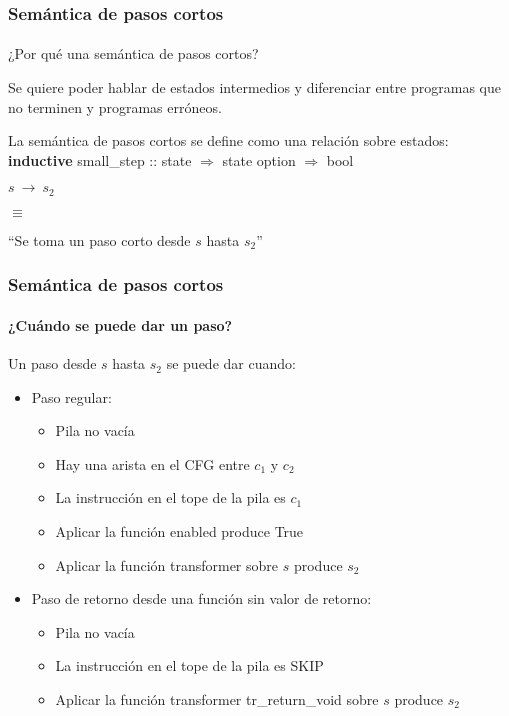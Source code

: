 \begin{frame}
\frametitle{Semántica de pasos cortos}
\framesubtitle{}

¿Por qué una semántica de pasos cortos?
\bigskip
\pause

Se quiere poder hablar de estados intermedios y diferenciar entre programas que no terminen y programas erróneos.

\bigskip
\pause


\begin{block}{La semántica de pasos cortos se define como una relación sobre estados:}
\textbf{inductive} small\_step :: state $\Rightarrow$ state option $\Rightarrow$ bool
\bigskip

$s\ \rightarrow\ s_2$

$\equiv$

``Se toma un paso corto desde $s$ hasta $s_2$''
\end{block}


\end{frame}


\begin{frame}
\frametitle{Semántica de pasos cortos}
\framesubtitle{¿Cuándo se puede dar un paso?}

Un paso desde $s$ hasta $s_2$ se puede dar cuando:
\begin{itemize}
\item{Paso regular:}
\begin{itemize}
\item{Pila no vacía}
\item{Hay una arista en el CFG entre $c_1$ y $c_2$}
\item{La instrucción en el tope de la pila es $c_1$}
\item{Aplicar la función enabled produce True}
\item{Aplicar la función transformer sobre $s$ produce $s_2$}
\end{itemize}
\item{Paso de retorno desde una función sin valor de retorno:}
\begin{itemize}
\item{Pila no vacía}
\item{La instrucción en el tope de la pila es SKIP}
\item{Aplicar la función transformer tr\_return\_void sobre $s$ produce $s_2$}
\end{itemize}
\end{itemize}

\end{frame}


